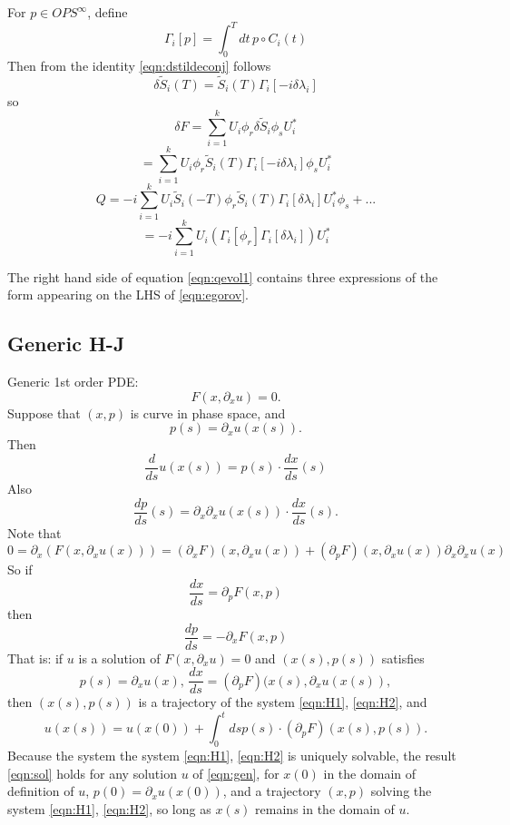For $p \in OPS^{\infty}$, define
\[
  \Gamma_i[p] = \int_0^T dt \, p \circ C_i(t)
\]
Then from the identity \ref{eqn:dstildeconj} follows
\[
  \delta\tilde{S}_i(T) = \tilde{S}_i(T) \Gamma_i[ -i \delta \lambda_i]
\] 
so
\[
  \delta F = \sum_{i=1}^k U_i \phi_r \delta \tilde{S}_i \phi_s U_i^*
\]
\[
  =\sum_{i=1}^k U_i \phi_r \tilde{S}_i(T) \Gamma_i[ -i \delta \lambda_i]\phi_s U_i^*
\]
\[
 Q = -i\sum_{i=1}^k U_i \tilde{S}_i(-T) \phi_r \tilde{S}_i(T) \Gamma_i[\delta \lambda_i] U_i^*\phi_s
  + ...
\]
\[
  = -i \sum_{i=1}^k U_i (\Gamma_i[\phi_r] \Gamma_i[\delta \lambda_i] )
  U_i^*
\]

 
The right hand side of equation \ref{eqn:qevol1} contains three
expressions of the form appearing on the LHS of \ref{eqn:egorov}.

\subsection{Generic H-J}
Generic 1st order PDE:
\begin{equation}
  \label{eqn:gen}
  F(x, \partial_x u) = 0.
\end{equation}
Suppose that $(x,p)$
is curve in phase space, and
\begin{equation}
  \label{eqn:defp}
  p(s) = \partial_x u(x(s)).
\end{equation}
Then
\[
  \frac{d}{ds}u(x(s))=p(s) \cdot \frac{dx}{ds}(s)
\]
Also
\[
  \frac{dp}{ds}(s) = \partial_x \partial_x u(x(s))\cdot
  \frac{dx}{ds}(s).
\]
Note that
\[
  0 = \partial_x( F(x, \partial_x u(x))) = (\partial_x F)(x,
  \partial_x u(x)) + 
  (\partial_p F)(x, \partial_x u(x)) \partial_x \partial_x u(x)
\]
So if
\begin{equation}
  \label{eqn:H1}
  \frac{dx}{ds} = \partial_p F(x,p)
\end{equation}
then
\begin{equation}
  \label{eqn:H2}
  \frac{dp}{ds} = -\partial_x F(x,p)
\end{equation}
That is: if $u$ is a solution of $F(x,\partial_x u)=0$ and
$(x(s),p(s))$ satisfies
\[
  p(s)=\partial_x u(x),\, \frac{dx}{ds} = (\partial_p
  F)(x(s),\partial_x u(x(s)),
\]
then $(x(s),p(s))$ is a trajectory of the system \ref{eqn:H1},
\ref{eqn:H2}, and
\begin{equation}
  \label{eqn:sol}
  u(x(s))=u(x(0)) + \int_0^t ds p(s)\cdot (\partial_p F)(x(s),p(s)).
\end{equation}
Because the system the system \ref{eqn:H1},
\ref{eqn:H2} is uniquely solvable, the result \ref{eqn:sol} holds for
any solution $u$ of \ref{eqn:gen}, for $x(0)$ in the domain of
definition of $u$, $p(0)=\partial_xu(x(0))$, and a trajectory $(x,p)$
solving the system \ref{eqn:H1}, \ref{eqn:H2}, so long as $x(s)$
remains in the domain of $u$.

